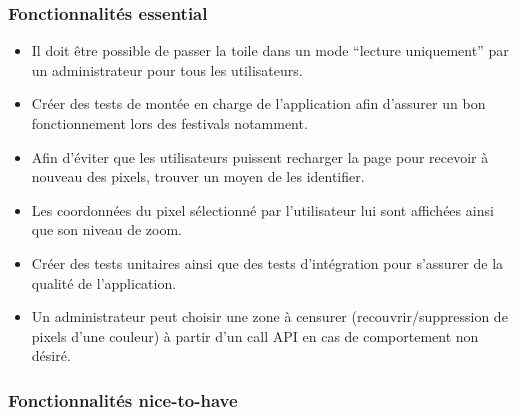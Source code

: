\subsubsection{Fonctionnalités \guillemotleft essential\guillemotright}

\begin{itemize}
  \item Il doit être possible de passer la toile dans un mode “lecture uniquement” par un administrateur pour tous les utilisateurs.
  \item Créer des tests de montée en charge de l'application afin d'assurer un bon fonctionnement lors des festivals notamment.
  \item Afin d'éviter que les utilisateurs puissent recharger la page pour recevoir à nouveau des pixels, trouver un moyen de les identifier.
  \item Les coordonnées du pixel sélectionné par l'utilisateur lui sont affichées ainsi que son niveau de zoom.
  \item Créer des tests unitaires ainsi que des tests d'intégration pour s'assurer de la qualité de l'application.
  \item Un administrateur peut choisir une zone à censurer (recouvrir/suppression de pixels d'une couleur) à partir d'un call API en cas de comportement non désiré.
\end{itemize}

\subsubsection{Fonctionnalités \guillemotleft nice-to-have\guillemotright}

